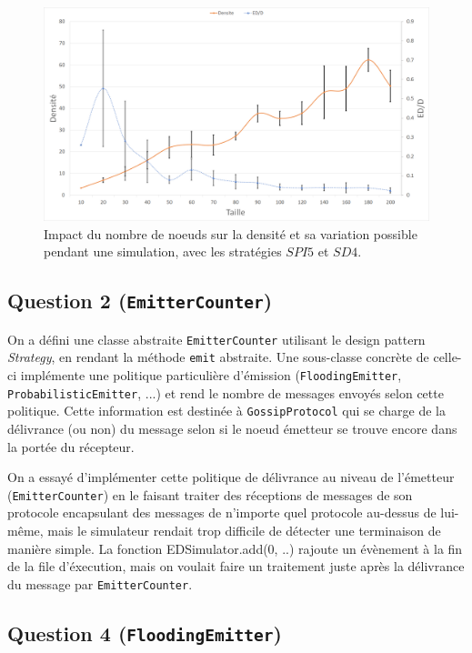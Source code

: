 \documentclass[a4paper]{article}
\begin{document}
\begin{figure}[H]
\begin{minipage}{\textwidth}
  \centering
    \includegraphics[width=\textwidth]{images/ex2.png}
    \caption{Impact du nombre de noeuds sur la densité et sa variation possible
      pendant une simulation, avec les stratégies $SPI5$ et $SD4$.}
\end{minipage}
\end{figure}

\subsection{Question 2 (\texttt{EmitterCounter})}
On a défini une classe abstraite \texttt{EmitterCounter} utilisant le
design pattern \textsl{Strategy}, en rendant la méthode \texttt{emit}
abstraite. Une sous-classe concrète de celle-ci implémente une politique particulière d'émission
(\texttt{FloodingEmitter}, \texttt{ProbabilisticEmitter}, ...) et rend
le nombre de messages envoyés selon cette politique.
Cette information est destinée à \texttt{GossipProtocol} qui se charge
de la délivrance (ou non) du message selon si le noeud émetteur se
trouve encore dans la portée du récepteur.

On a essayé d'implémenter
cette politique de délivrance au niveau de l'émetteur
(\texttt{EmitterCounter}) en le faisant traiter des réceptions de
messages de son protocole encapsulant des messages de n'importe quel
protocole au-dessus de lui-même, mais le simulateur rendait trop difficile de détecter
une terminaison de manière simple. La fonction EDSimulator.add(0, ..)
rajoute un évènement à la fin de la file d'éxecution, mais on voulait
faire un traitement juste après la délivrance du message par \texttt{EmitterCounter}.

\subsection{Question 4 (\texttt{FloodingEmitter})}
\end{document}
